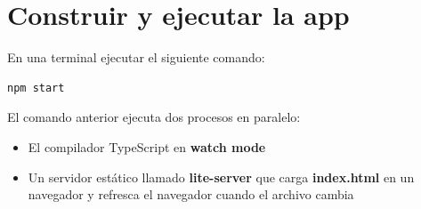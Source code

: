 \documentclass[12pt,twoside]{book}
\begin{document}
\section{Construir y ejecutar la app}

En una terminal ejecutar el siguiente comando:

\begin{lstlisting}[language=html]
npm start
\end{lstlisting}
 El comando anterior ejecuta dos procesos en paralelo:
 
 \begin{itemize}
\item El compilador TypeScript en \textbf{watch mode}
\item Un servidor estático llamado \textbf{lite-server} que carga \textbf{index.html} en un navegador y refresca el navegador cuando el archivo cambia
\end{itemize}







\end{document}

